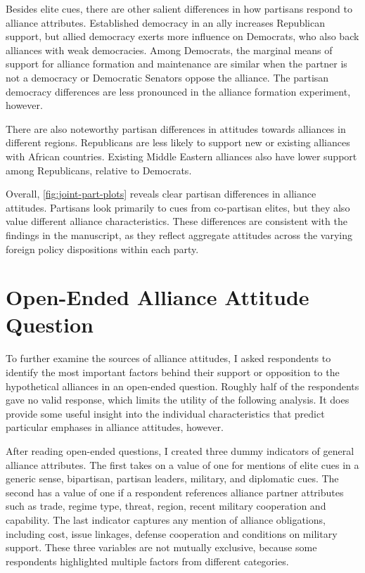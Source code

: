 \documentclass[12pt]{article}
\begin{document}
Besides elite cues, there are other salient differences in how partisans respond to alliance attributes.
Established democracy in an ally increases Republican support, but allied democracy exerts more influence on Democrats, who also back alliances with weak democracies. 
Among Democrats, the marginal means of support for alliance formation and maintenance are similar when the partner is not a democracy or Democratic Senators oppose the alliance.  
The partisan democracy differences are less pronounced in the alliance formation experiment, however. 


There are also noteworthy partisan differences in attitudes towards alliances in different regions.
Republicans are less likely to support new or existing alliances with African countries. 
Existing Middle Eastern alliances also have lower support among Republicans, relative to Democrats.


Overall, \autoref{fig:joint-part-plots} reveals clear partisan differences in alliance attitudes. 
Partisans look primarily to cues from co-partisan elites, but they also value different alliance characteristics. 
These differences are consistent with the findings in the manuscript, as they reflect aggregate attitudes across the varying foreign policy dispositions within each party. 



\section{Open-Ended Alliance Attitude Question} 


To further examine the sources of alliance attitudes, I asked respondents to identify the most important factors behind their support or opposition to the hypothetical alliances in an open-ended question. 
Roughly half of the respondents gave no valid response, which limits the utility of the following analysis. 
It does provide some useful insight into the individual characteristics that predict particular emphases in alliance attitudes, however. 


After reading open-ended questions, I created three dummy indicators of general alliance attributes. 
The first takes on a value of one for mentions of elite cues in a generic sense, bipartisan, partisan leaders, military, and diplomatic cues. 
The second has a value of one if a respondent references alliance partner attributes such as trade, regime type, threat, region, recent military cooperation and capability. 
The last indicator captures any mention of alliance obligations, including cost, issue linkages, defense cooperation and conditions on military support. 
These three variables are not mutually exclusive, because some respondents highlighted multiple factors from different categories. 
\end{document}
